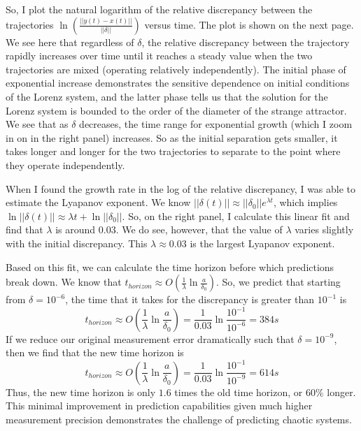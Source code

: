 \documentclass[11pt]{article}
\begin{document}
So, I plot the natural logarithm of the relative discrepancy between the trajectories $\ln(\frac{||y(t) - x(t)||}{||\delta||})$ versus time. The plot is shown on the next page. We see here that regardless of $\delta$, the relative discrepancy between the trajectory rapidly increases over time until it reaches a steady value when the two trajectories are mixed (operating relatively independently). The initial phase of exponential increase demonstrates the sensitive dependence on initial conditions of the Lorenz system, and the latter phase tells us that the solution for the Lorenz system is bounded to the order of the diameter of the strange attractor. We see that as $\delta$ decreases, the time range for exponential growth (which I zoom in on in the right panel) increases. So as the initial separation gets smaller, it takes longer and longer for the two trajectories to separate to the point where they operate independently.

When I found the growth rate in the log of the relative discrepancy, I was able to estimate the Lyapanov exponent. We know $||\delta(t)|| \approx ||\delta_0||e^{\lambda  t}$, which implies $\ln ||\delta(t)|| \approx \lambda t + \ln || \delta_0 ||$. So, on the right panel, I calculate this linear fit and find that $\lambda$ is around $0.03$. We do see, however, that the value of $\lambda$ varies slightly with the initial discrepancy. This $\lambda \approx 0.03 $ is the largest Lyapanov exponent. 

Based on this fit, we can calculate the time horizon before which predictions break down. We know that $t_{horizon} \approx O(\frac{1}{\lambda} \ln \frac{a}{\delta_0})$. So, we predict that starting from $\delta = 10^{-6}$, the time that it takes for the discrepancy is greater than $10^{-1}$ is 
 $$t_{horizon} \approx O(\frac{1}{\lambda} \ln \frac{a}{\delta_0}) = \frac{1}{0.03} \ln \frac{10^{-1}}{10^{-6}} = 384 s$$
If we reduce our original measurement error dramatically such that $\delta = 10^{-9}$, then we find that the new time horizon is 
 $$t_{horizon} \approx O(\frac{1}{\lambda} \ln \frac{a}{\delta_0}) = \frac{1}{0.03} \ln \frac{10^{-1}}{10^{-9}} = 614 s$$
 Thus, the new time horizon is only $1.6$ times the old time horizon, or $60\%$ longer. This minimal improvement in prediction capabilities given much higher measurement precision demonstrates the challenge of predicting chaotic systems.
 
\end{document}

